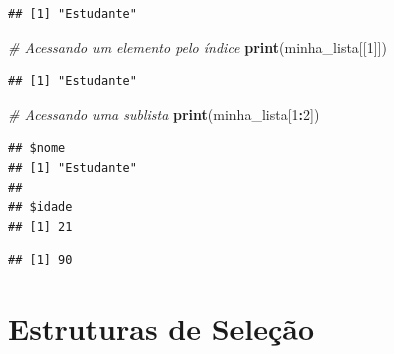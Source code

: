 \documentclass[
]{book}
\newenvironment{Shaded}{\begin{snugshade}}{\end{snugshade}}
\newcommand{\CommentTok}[1]{\textcolor[rgb]{0.56,0.35,0.01}{\textit{#1}}}
\newcommand{\DecValTok}[1]{\textcolor[rgb]{0.00,0.00,0.81}{#1}}
\newcommand{\FunctionTok}[1]{\textcolor[rgb]{0.13,0.29,0.53}{\textbf{#1}}}
\newcommand{\NormalTok}[1]{#1}
\newcommand{\SpecialCharTok}[1]{\textcolor[rgb]{0.81,0.36,0.00}{\textbf{#1}}}
\begin{document}
\begin{Shaded}
\end{Shaded}

\begin{verbatim}
## [1] "Estudante"
\end{verbatim}

\begin{Shaded}
\begin{Highlighting}[]
\CommentTok{\# Acessando um elemento pelo índice}
\FunctionTok{print}\NormalTok{(minha\_lista[[}\DecValTok{1}\NormalTok{]])}
\end{Highlighting}
\end{Shaded}

\begin{verbatim}
## [1] "Estudante"
\end{verbatim}

\begin{Shaded}
\begin{Highlighting}[]
\CommentTok{\# Acessando uma sublista}
\FunctionTok{print}\NormalTok{(minha\_lista[}\DecValTok{1}\SpecialCharTok{:}\DecValTok{2}\NormalTok{])}
\end{Highlighting}
\end{Shaded}

\begin{verbatim}
## $nome
## [1] "Estudante"
## 
## $idade
## [1] 21
\end{verbatim}

\begin{Shaded}
\end{Shaded}

\begin{verbatim}
## [1] 90
\end{verbatim}

\chapter{Estruturas de Seleção}\label{estruturas-de-seleuxe7uxe3o}
\end{document}
